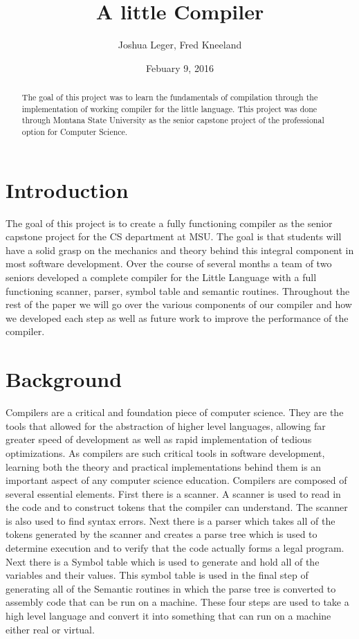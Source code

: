 \documentclass[12pt]{article}
\title{A little Compiler}
\author{Joshua Leger, Fred Kneeland}
\date{Febuary 9, 2016}
\begin{document}
    \maketitle
    \begin{abstract}
    
        The goal of this project was to learn the fundamentals of compilation through the implementation of working compiler for the little language.  This project was done through Montana State University as the senior capstone project of the professional option for Computer Science.   
    
    \end{abstract}
    \clearpage
    \tableofcontents
    \clearpage
    
    \section{Introduction}
        The goal of this project is to create a fully functioning compiler as the senior capstone project for the CS department at MSU.  The goal is that students will have a solid grasp on the mechanics and theory behind this integral component in most software development.  Over the course of several months a team of two seniors developed a complete compiler for the Little Language with a full functioning scanner, parser, symbol table and semantic routines.  Throughout the rest of the paper we will go over the various components of our compiler and how we developed each step as well as future work to improve the performance of the compiler.
            
    \section{Background}
        Compilers are a critical and foundation piece of computer science.  They are the tools that allowed for the abstraction of higher level languages, allowing far greater speed of development as well as rapid implementation of tedious optimizations.  As compilers are such critical tools in software development, learning both the theory and practical implementations behind them is an important aspect of any computer science education.  
        Compilers are composed of several essential elements.  First there is a scanner.  A scanner is used to read in the code and to construct tokens that the compiler can understand.  The scanner is also used to find syntax errors.  Next there is a parser which takes all of the tokens generated by the scanner and creates a parse tree which is used to determine execution and to verify that the code actually forms a legal program.  Next there is a Symbol table which is used to generate and hold all of the variables and their values.  This symbol table is used in the final step of generating all of the Semantic routines in which the parse tree is converted to assembly code that can be run on a machine.  These four steps are used to take a high level language and convert it into something that can run on a machine either real or virtual. 
        
\end{document}
